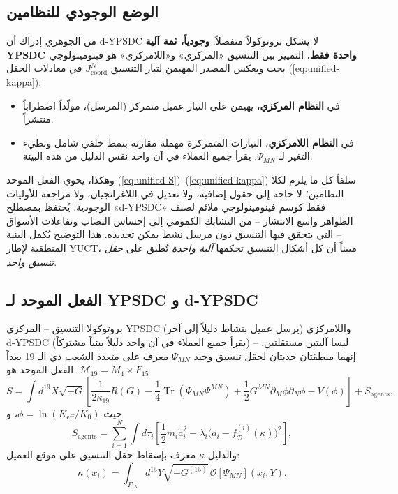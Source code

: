 \documentclass[12pt,a4paper]{article}
\DeclareMathOperator{\Tr}{Tr}
\begin{document}
	\subsection{الوضع الوجودي للنظامين}
	\label{subsec:ontological-status}
	
	من الجوهري إدراك أن d‑YPSDC لا يشكل بروتوكولاً منفصلاً.
	\textbf{وجودياً، ثمة آلية YPSDC واحدة فقط.} التمييز بين التنسيق «المركزي» و«اللامركزي» هو فينومينولوجي بحت ويعكس المصدر المهيمن لتيار التنسيق \(J^{N}_{\mathrm{coord}}\) في معادلات الحقل (\ref{eq:unified-kappa}):
	
	\begin{itemize}[leftmargin=*]
		\item في \textbf{النظام المركزي}، يهيمن على التيار عميل متمركز (المرسل)، مولّداً اضطراباً منتشراً.
		\item في \textbf{النظام اللامركزي}، التيارات المتمركزة مهملة مقارنة بنمط خلفي شامل وبطيء التغير لـ \(\Psi_{MN}\). يقرأ جميع العملاء في آن واحد نفس الدليل من هذه البيئة.
	\end{itemize}
	
	وهكذا، يحوي الفعل الموحد (\ref{eq:unified-S})--(\ref{eq:unified-kappa}) سلفاً كل ما يلزم لكلا النظامين؛ لا حاجة إلى حقول إضافية، ولا تعديل في اللاغرانجيان، ولا مراجعة للأوليات الوجودية.
	يُحتفظ بمصطلح «d‑YPSDC» فقط كوسم فينومينولوجي ملائم لصنف الظواهر واسع الانتشار – من التشابك الكمومي إلى إحساس النصاب وتفاعلات الأسواق – التي يتحقق فيها التنسيق دون مرسل نشط يمكن تحديده. هذا التوضيح يُكمل البنية المنطقية لإطار YUCT، مبيناً أن كل أشكال التنسيق تحكمها \emph{آلية واحدة} تُطبق على \emph{حقل تنسيق واحد}.
	
	\subsection{الفعل الموحد لـ YPSDC و d‑YPSDC}
	\label{subsec:unified-action}
	
	بروتوكولا التنسيق – المركزي YPSDC (يرسل عميل بنشاط دليلاً إلى آخر) واللامركزي d‑YPSDC (يقرأ جميع العملاء في آن واحد دليلاً بيئياً مشتركاً) – ليسا آليتين مستقلتين. إنهما منطقتان حديتان لحقل تنسيق وحيد \(\Psi_{MN}\) معرف على متعدد الشعب ذي الـ 19 بعداً \(\mathcal{M}_{19}=M_4\times F_{15}\). الفعل الموحد هو
	\begin{equation}
		S = \int d^{19}X \sqrt{-G} \left[ \frac{1}{2\kappa_{19}} R(G)
		- \frac{1}{4} \Tr(\Psi_{MN}\Psi^{MN}) + \frac{1}{2} G^{MN}\partial_M\phi \partial_N\phi
		- V(\phi) \right] + S_{\mathrm{agents}},
		\label{eq:unified-S}
	\end{equation}
	حيث \(\phi = \ln(K_{\mathrm{eff}}/K_0)\)، و
	\begin{equation}
		S_{\mathrm{agents}} = \sum_{i=1}^{N} \int d\tau_i \left[ \frac{1}{2} m_i \dot a_i^2
		- \lambda_i \bigl( a_i - f_{\mathcal{D}}^{(i)}(\kappa) \bigr)^2 \right],
		\label{eq:unified-agents}
	\end{equation}
	والدليل \(\kappa\) معرف بإسقاط حقل التنسيق على موقع العميل:
	\begin{equation}
		\kappa(x_i) = \int_{F_{15}} d^{15}Y \sqrt{-G^{(15)}}\,
		\mathcal{O}[\Psi_{MN}](x_i, Y).
		\label{eq:unified-kappa}
	\end{equation}
	
\end{document}
